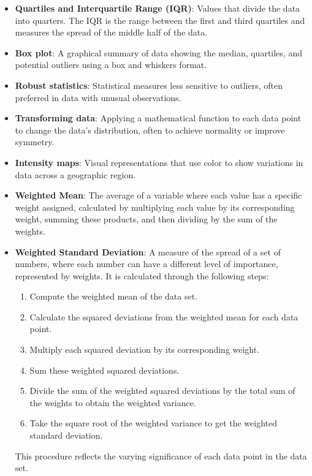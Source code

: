 \documentclass{article}
\begin{document}
\begin{itemize}
    \item \textbf{Quartiles and Interquartile Range (IQR)}: Values that divide the data into quarters. The IQR is the range between the first and third quartiles and measures the spread of the middle half of the data.
    \item \textbf{Box plot}: A graphical summary of data showing the median, quartiles, and potential outliers using a box and whiskers format.
    \item \textbf{Robust statistics}: Statistical measures less sensitive to outliers, often preferred in data with unusual observations.
    \item \textbf{Transforming data}: Applying a mathematical function to each data point to change the data's distribution, often to achieve normality or improve symmetry.
    \item \textbf{Intensity maps}: Visual representations that use color to show variations in data across a geographic region.
    \item \textbf{Weighted Mean}: The average of a variable where each value has a specific weight assigned, calculated by multiplying each value by its corresponding weight, summing these products, and then dividing by the sum of the weights.
    \item \textbf{Weighted Standard Deviation}: A measure of the spread of a set of numbers, where each number can have a different level of importance, represented by weights. It is calculated through the following steps:
    \begin{enumerate}
        \item Compute the weighted mean of the data set.
        \item Calculate the squared deviations from the weighted mean for each data point.
        \item Multiply each squared deviation by its corresponding weight.
        \item Sum these weighted squared deviations.
        \item Divide the sum of the weighted squared deviations by the total sum of the weights to obtain the weighted variance.
        \item Take the square root of the weighted variance to get the weighted standard deviation.
    \end{enumerate}
This procedure reflects the varying significance of each data point in the data set.

\end{itemize}
\end{document}

